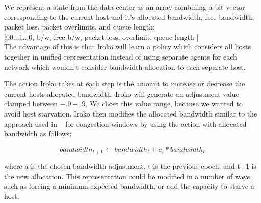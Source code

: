 We represent a state from the data center as an array combining a bit vector corresponding to the current host and it's allocated bandwidth, free bandwidth, packet loss, packet overlimits, and queue length:\\
 
[$0 0 ... 1 ... 0$, b/w, free b/w, packet loss, overlimit, queue length ]\\

The advantage of this is that Iroko will learn a policy which considers all hosts together in unified representation instead of using separate agents for each network which wouldn't consider bandwidth allocation to each separate host.

The action Iroko takes at each step is the amount to increase or decrease the current hosts allocated bandwidth. Iroko will generate an adjustment value clamped between $-.9 - .9$. We chose this value range, because we wanted to avoid host starvation.  Iroko then modifies the allocated bandwidth similar to the approach used in ~\cite{remy} for congestion windows by using the action with allocated bandwidth as follows:

\[bandwidth_{t+1}   \leftarrow bandwidth_t +  a_t * bandwidth_t\]

where a is the chosen bandwidth adjustment, t is the previous epoch, and t+1 is the new allocation. This representation could be  modified in a number of ways, such as forcing a minimum expected bandwidth, or add the capacity to starve a host.



